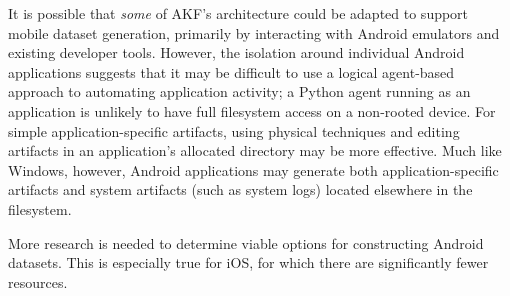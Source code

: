 It is possible that \emph{some} of AKF's architecture could be adapted
to support mobile dataset generation, primarily by interacting with
Android emulators and existing developer tools. However, the isolation
around individual Android applications suggests that it may be difficult
to use a logical agent-based approach to automating application
activity; a Python agent running as an application is unlikely to have
full filesystem access on a non-rooted device. For simple
application-specific artifacts, using physical techniques and editing
artifacts in an application's allocated directory may be more effective.
Much like Windows, however, Android applications may generate both
application-specific artifacts and system artifacts (such as system
logs) located elsewhere in the filesystem.

More research is needed to determine viable options for constructing
Android datasets. This is especially true for iOS, for which there are
significantly fewer resources.
